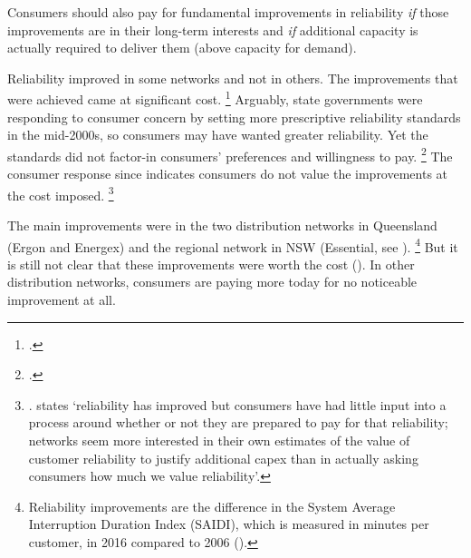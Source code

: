 \documentclass[FrontPage]{grattan}
\begin{document}
Consumers should also pay for fundamental improvements in reliability \emph{if} those improvements are in their long-term interests and \emph{if} additional capacity is actually required to deliver them (above capacity for demand).

Reliability improved in some networks and not in others. The improvements that were achieved came at significant cost.%
\footcites[][549]{PC2013ElectricityInquiry}{AER2017StateOfEnergyMarket} 
Arguably, state governments were responding to consumer concern by setting more prescriptive reliability standards in the mid-2000s, so consumers may have wanted greater reliability. Yet the standards did not factor-in consumers' preferences and willingness to pay.%
\footcite{PC2013ElectricityInquiry} 
The consumer response since indicates consumers do not value the improvements at the cost imposed.%
\footnote{. \textcite{EUAA2017SubmissionToAERReviewROR} states `reliability has improved but	consumers have had little input into a process around whether or not they are prepared to pay for that reliability; networks seem more interested in their own estimates of the value of customer reliability to justify additional capex than in actually asking consumers how much we value reliability'.}

The main improvements were in the two distribution networks in Queensland (Ergon and Energex) and the regional network in NSW (Essential, see ).%
\footnote{Reliability improvements are the difference in the System Average Interruption Duration Index (SAIDI), which is measured in minutes per customer, in 2016 compared to 2006 (\textcite{AER2017DNSPperformanceindicators}).}
But it is still not clear that these improvements were worth the cost (). In other distribution networks, consumers are paying more today for no noticeable improvement at all.
\end{document}
